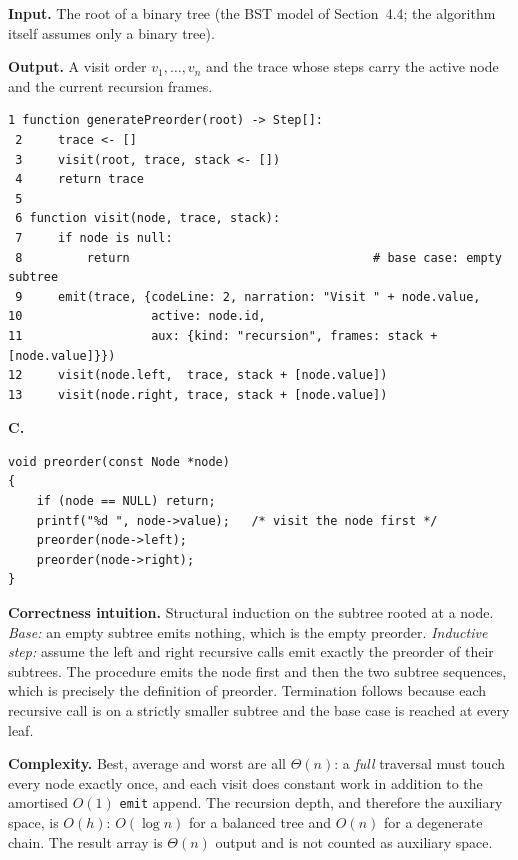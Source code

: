 \documentclass[11pt,a4paper]{article}
\newcommand{\ct}[1]{\texttt{#1}}
\begin{document}
\smallskip
\noindent\textbf{Input.} The root of a binary tree (the BST model of Section~4.4; the algorithm
itself assumes only a binary tree).

\smallskip
\noindent\textbf{Output.} A visit order $v_1,\dots,v_n$ and the trace whose steps carry the active
node and the current recursion frames.

\begin{lstlisting}[style=pseudo,caption={Instrumented preorder traversal. The \ct{emit} call on
line 9 is the only difference from the textbook algorithm; it publishes the node being visited and
the live call stack.},label={lst:preorder}]
 1 function generatePreorder(root) -> Step[]:
 2     trace <- []
 3     visit(root, trace, stack <- [])
 4     return trace
 5
 6 function visit(node, trace, stack):
 7     if node is null:
 8         return                                  # base case: empty subtree
 9     emit(trace, {codeLine: 2, narration: "Visit " + node.value,
10                  active: node.id,
11                  aux: {kind: "recursion", frames: stack + [node.value]}})
12     visit(node.left,  trace, stack + [node.value])
13     visit(node.right, trace, stack + [node.value])
\end{lstlisting}

\smallskip
\noindent\textbf{C.}
\begin{lstlisting}[style=c,caption={Preorder traversal in C.},label={lst:c-preorder}]
void preorder(const Node *node)
{
    if (node == NULL) return;
    printf("%d ", node->value);   /* visit the node first */
    preorder(node->left);
    preorder(node->right);
}
\end{lstlisting}

\noindent\textbf{Correctness intuition.} Structural induction on the subtree rooted at a node.
\emph{Base:} an empty subtree emits nothing, which is the empty preorder. \emph{Inductive step:}
assume the left and right recursive calls emit exactly the preorder of their subtrees. The
procedure emits the node first and then the two subtree sequences, which is precisely the
definition of preorder. Termination follows because each recursive call is on a strictly smaller
subtree and the base case is reached at every leaf.

\smallskip
\noindent\textbf{Complexity.} Best, average and worst are all $\Theta(n)$: a \emph{full} traversal
must touch every node exactly once, and each visit does constant work in addition to the
amortised $O(1)$ \ct{emit} append. The recursion depth, and therefore the auxiliary space, is
$O(h)$: $O(\log n)$ for a balanced tree and $O(n)$ for a degenerate chain. The result array is
$\Theta(n)$ output and is not counted as auxiliary space.
\end{document}
